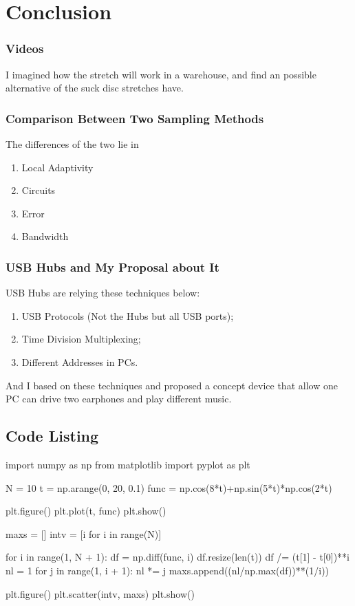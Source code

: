 \documentclass{article}
\begin{document}
\section{Conclusion}
\subsubsection*{Videos}
I imagined how the stretch will work in a warehouse, and find an possible alternative of the suck disc stretches have.
\subsubsection*{Comparison Between Two Sampling Methods}
The differences of the two lie in
\begin{enumerate}
	\item Local Adaptivity
	\item Circuits
	\item Error
	\item Bandwidth
\end{enumerate}
\subsubsection*{USB Hubs and My Proposal about It}
USB Hubs are relying these techniques below:
\begin{enumerate}
	\item USB Protocols (Not the Hubs but all USB ports);
	\item Time Division Multiplexing;
	\item Different Addresses in PCs.
\end{enumerate}

And I based on these techniques and proposed a concept device that allow one PC can drive two earphones and play different music.





\begin{appendices}
\section{Code Listing}
\begin{python}
import numpy as np
from matplotlib import pyplot as plt

N = 10
t = np.arange(0, 20, 0.1)
func = np.cos(8*t)+np.sin(5*t)*np.cos(2*t)

plt.figure()
plt.plot(t, func)
plt.show()

maxs = []
intv = [i for i in range(N)]

for i in range(1, N + 1):
    df = np.diff(func, i)
    df.resize(len(t))
    df /= (t[1] - t[0])**i
    nl = 1
    for j in range(1, i + 1):
        nl *= j
    maxs.append((nl/np.max(df))**(1/i))

plt.figure()
plt.scatter(intv, maxs)
plt.show()
\end{python}
\end{appendices}
\end{document}

